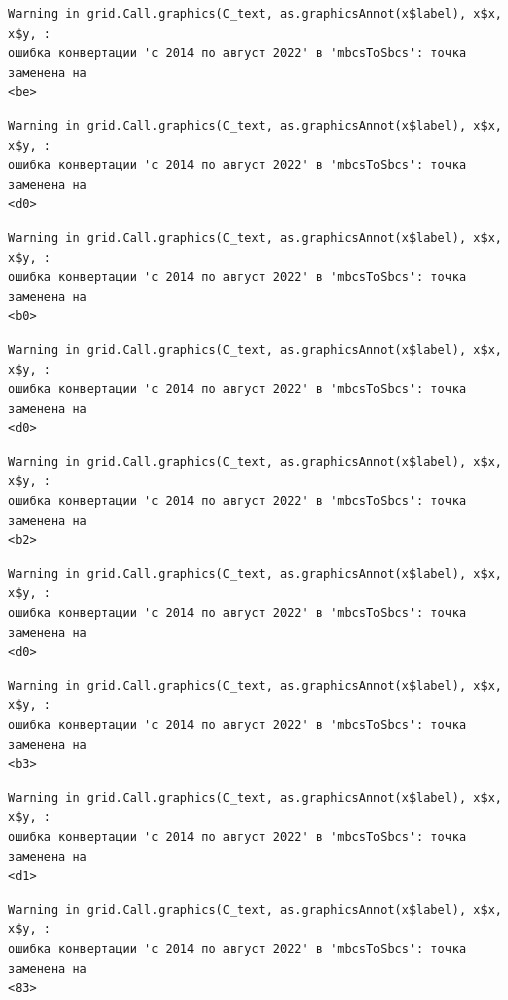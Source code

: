 \documentclass[
  letterpaper,
  DIV=11,
  numbers=noendperiod]{scrreprt}
\begin{document}
\begin{verbatim}
Warning in grid.Call.graphics(C_text, as.graphicsAnnot(x$label), x$x, x$y, :
ошибка конвертации 'с 2014 по август 2022' в 'mbcsToSbcs': точка заменена на
<be>
\end{verbatim}

\begin{verbatim}
Warning in grid.Call.graphics(C_text, as.graphicsAnnot(x$label), x$x, x$y, :
ошибка конвертации 'с 2014 по август 2022' в 'mbcsToSbcs': точка заменена на
<d0>
\end{verbatim}

\begin{verbatim}
Warning in grid.Call.graphics(C_text, as.graphicsAnnot(x$label), x$x, x$y, :
ошибка конвертации 'с 2014 по август 2022' в 'mbcsToSbcs': точка заменена на
<b0>
\end{verbatim}

\begin{verbatim}
Warning in grid.Call.graphics(C_text, as.graphicsAnnot(x$label), x$x, x$y, :
ошибка конвертации 'с 2014 по август 2022' в 'mbcsToSbcs': точка заменена на
<d0>
\end{verbatim}

\begin{verbatim}
Warning in grid.Call.graphics(C_text, as.graphicsAnnot(x$label), x$x, x$y, :
ошибка конвертации 'с 2014 по август 2022' в 'mbcsToSbcs': точка заменена на
<b2>
\end{verbatim}

\begin{verbatim}
Warning in grid.Call.graphics(C_text, as.graphicsAnnot(x$label), x$x, x$y, :
ошибка конвертации 'с 2014 по август 2022' в 'mbcsToSbcs': точка заменена на
<d0>
\end{verbatim}

\begin{verbatim}
Warning in grid.Call.graphics(C_text, as.graphicsAnnot(x$label), x$x, x$y, :
ошибка конвертации 'с 2014 по август 2022' в 'mbcsToSbcs': точка заменена на
<b3>
\end{verbatim}

\begin{verbatim}
Warning in grid.Call.graphics(C_text, as.graphicsAnnot(x$label), x$x, x$y, :
ошибка конвертации 'с 2014 по август 2022' в 'mbcsToSbcs': точка заменена на
<d1>
\end{verbatim}

\begin{verbatim}
Warning in grid.Call.graphics(C_text, as.graphicsAnnot(x$label), x$x, x$y, :
ошибка конвертации 'с 2014 по август 2022' в 'mbcsToSbcs': точка заменена на
<83>
\end{verbatim}
\end{document}
